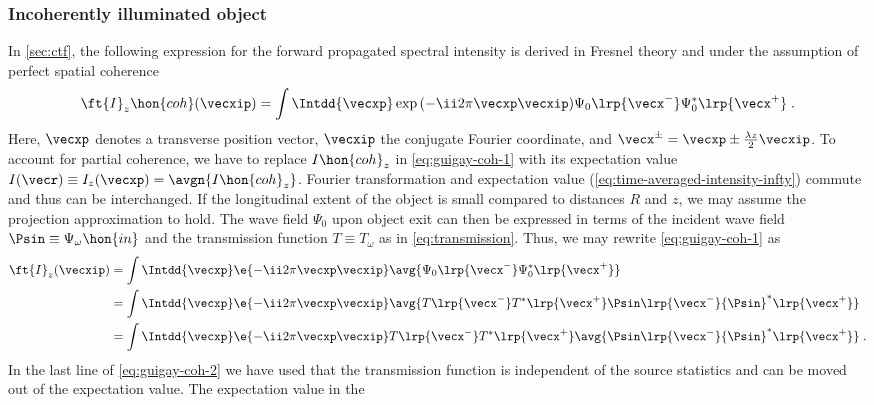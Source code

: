 \documentclass[
twoside,
openright,
titlepage,
numbers=noenddot,
headinclude,
fleqn,
a4paper,
footinclude=true,
cleardoublepage=empty,
abstractoff,
BCOR=5mm,
paper=a4,
fontsize=11pt,
british,ngerman,american,
]{scrreprt}
\begin{document}
\subsubsection{Incoherently illuminated object}
\label{sec:incoherent-illumination}

In \cref{sec:ctf}, the following expression for the forward propagated
spectral intensity is derived in Fresnel theory and under the
assumption of perfect spatial coherence
\begin{equation}
  \label{eq:guigay-coh-1}
  \begin{split}
    \ft{I}_z\hon{coh}(\vecxip) = 
     \int \Intdd{\vecxp}\exp{(-\ii 2\pi\vecxp\vecxip)} 
    \Psi_0\lrp{\vecx^- } \Psi^*_0\lrp{\vecx^+ } \;.
  \end{split}
\end{equation}
Here, $\vecxp$ denotes a transverse position vector, $\vecxip$ the
conjugate Fourier coordinate, and $\vecx^\pm = \vecxp\pm\tfrac{\lambda
  z}{2}\vecxip$.  To account for partial coherence, we have to replace
$I\hon{coh}_z$ in \cref{eq:guigay-coh-1} with its expectation value
$I(\vecr)\equiv I_z(\vecxp) = \avgn{I\hon{coh}_z}$.  Fourier
transformation and expectation value
(\cref{eq:time-averaged-intensity-infty}) commute and thus can be
interchanged.  If the longitudinal extent of the object is small
compared to distances $R$ and $z$, we may assume the projection
approximation to hold.  The wave field $\Psi_0$ upon object exit can
then be expressed in terms of the incident wave field
$\Psin\equiv\Psi_\omega\hon{in}$ and the transmission function
$T\equiv T_\omega$ as in \cref{eq:transmission}.  Thus, we may rewrite
\cref{eq:guigay-coh-1} as
\begin{equation}
  \label{eq:guigay-coh-2}
  \begin{split}
    \ft{I}_z(\vecxip) 
    & = \int \Intdd{\vecxp}\e{-\ii 2\pi\vecxp\vecxip}
    \avg{ \Psi_0\lrp{\vecx^-}\Psi^*_0\lrp{\vecx^+} } 
  \\ & = \int \Intdd{\vecxp}\e{-\ii 2\pi\vecxp\vecxip} \avg{
    T\lrp{\vecx^-}T^*\lrp{\vecx^+} 
    \Psin\lrp{\vecx^-}{\Psin}^*\lrp{\vecx^+} } 
  \\ & = \int \Intdd{\vecxp}\e{-\ii 2\pi\vecxp\vecxip} 
    T\lrp{\vecx^-}T^*\lrp{\vecx^+}
      \avg{ \Psin\lrp{\vecx^-}{\Psin}^*\lrp{\vecx^+ } } \;.
  \end{split}
\end{equation}
In the last line of \cref{eq:guigay-coh-2} we have used that the
transmission function is independent of the source statistics and can
be moved out of the expectation value.  The expectation value in the
\end{document}
